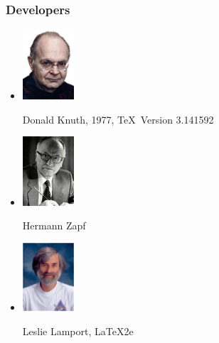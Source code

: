\documentclass[10pt,times]{beamer}
\begin{document}
\begin{frame}
\frametitle{Developers}
\begin{itemize}
\item
\parbox{0.25\textwidth}{
	\includegraphics[width=0.15\textwidth]{figs/Donald_Knuth.png}}
\parbox{0.65\textwidth}{Donald Knuth, 1977, \TeX ~Version 3.141592}
\item
\parbox{0.25\textwidth}{
	\includegraphics[width=0.15\textwidth]{figs/Hermann.jpg}}
\parbox{0.65\textwidth}{Hermann Zapf}
\item
\parbox{0.25\textwidth}{\includegraphics[width=0.15\textwidth]{figs/Leslie.png}}
\parbox{0.65\textwidth}{Leslie Lamport, \LaTeX2e}
\end{itemize}
\end{frame}
\end{document}
